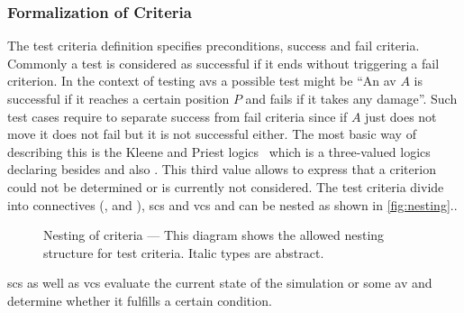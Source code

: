 \subsubsection{Formalization of Criteria}\label{subsubsec:criteria}
The test criteria definition specifies preconditions, success and fail criteria.
Commonly a test is considered as successful if it ends without triggering a fail criterion.
In the context of testing \glspl{av} a possible test might be ``An \gls{av} \(A\) is successful if it reaches a certain position \(P\) and fails if it takes any damage''.
Such test cases require to separate success from fail criteria since if \(A\) just does not move it does not fail but it is not successful either.
The most basic way of describing this is the Kleene and Priest logics~\cite{kleeneLogics} which is a three-valued logics declaring besides \iltrue{} and \ilfalse{} also \ilunknown{}.
This third value \ilunknown{} allows to express that a criterion could not be determined or is currently not considered.
The test criteria divide into connectives (\iland{}, \ilor{} and \ilnot{}), \glspl{sc} and \glspl{vc} and can be nested as shown in \autoref{fig:nesting}..
\begin{figure}
    \centering
    \caption{Nesting of criteria --- This diagram shows the allowed nesting structure for test criteria. Italic types are abstract.}\label{fig:nesting}
    \medskip
\end{figure}
\Glspl{sc} as well as \glspl{vc} evaluate the current state of the simulation or some \gls{av} and determine whether it fulfills a certain condition.
